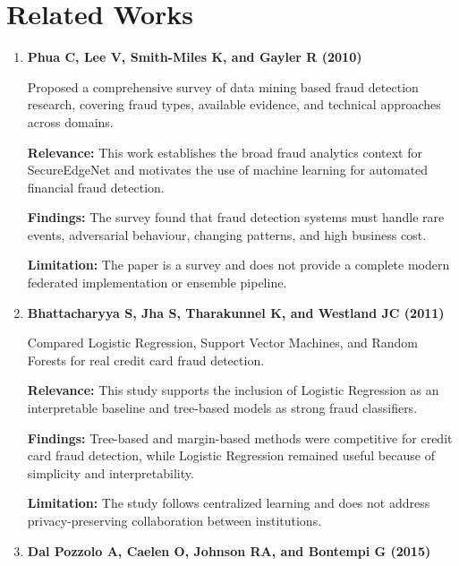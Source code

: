 \section{Related Works }
\begin{enumerate}
    \item \textbf{Phua C, Lee V, Smith-Miles K, and Gayler R (2010) \cite{ref1}}

    Proposed a comprehensive survey of data mining based fraud detection research, covering fraud types, available evidence, and technical approaches across domains.

    \textbf{Relevance:} This work establishes the broad fraud analytics context for SecureEdgeNet and motivates the use of machine learning for automated financial fraud detection.

    \textbf{Findings:} The survey found that fraud detection systems must handle rare events, adversarial behaviour, changing patterns, and high business cost.

    \textbf{Limitation:} The paper is a survey and does not provide a complete modern federated implementation or ensemble pipeline.

    \item \textbf{Bhattacharyya S, Jha S, Tharakunnel K, and Westland JC (2011) \cite{ref2}}

    Compared Logistic Regression, Support Vector Machines, and Random Forests for real credit card fraud detection.

    \textbf{Relevance:} This study supports the inclusion of Logistic Regression as an interpretable baseline and tree-based models as strong fraud classifiers.

    \textbf{Findings:} Tree-based and margin-based methods were competitive for credit card fraud detection, while Logistic Regression remained useful because of simplicity and interpretability.

    \textbf{Limitation:} The study follows centralized learning and does not address privacy-preserving collaboration between institutions.

    \item \textbf{Dal Pozzolo A, Caelen O, Johnson RA, and Bontempi G (2015) \cite{ref3}}


\end{enumerate}
